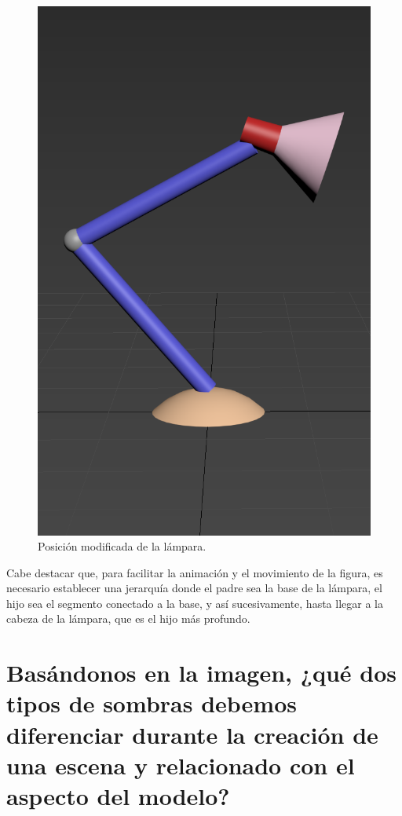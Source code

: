 \documentclass{article}
\begin{document}
 \begin{figure}[H]
    \centering
    \includegraphics[width=\textwidth]{imagenes/lamp2.png}
    \caption{Posición modificada de la lámpara.}
 \end{figure}    

Cabe destacar que, para facilitar la animación y el movimiento de la figura, es necesario establecer una jerarquía donde el padre sea la base de la lámpara, el hijo sea el segmento conectado a la base, y así sucesivamente, hasta llegar a la cabeza de la lámpara, que es el hijo más profundo.

\section{Basándonos en la imagen, ¿qué dos tipos de sombras debemos diferenciar durante la creación de una escena y relacionado con el aspecto del modelo?}
\end{document}
